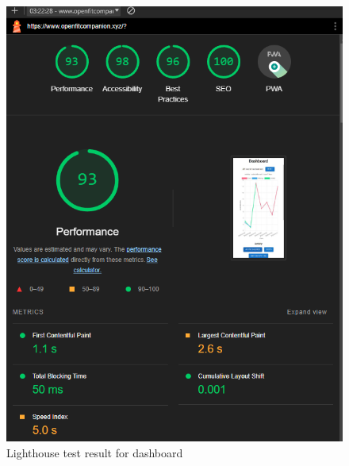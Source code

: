 \begin{figure}
    
    \centering
    \includegraphics[width=1\textwidth,keepaspectratio]{../images/lightHouseMainPage.png}
    \caption{Lighthouse test result for dashboard}
    \label{fig:lighthouse}
    
\end{figure}

